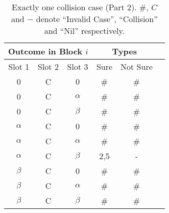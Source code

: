 \documentclass[fleqn]{article}
\begin{document}
\begin {table} 
\centering
\begin{tabular}{|c|c|c|c|c|c|} 
\hline
\multicolumn{3}{|c|}{Outcome in Block $i$} & \multicolumn{2}{c|}{Types} \\ \hline
Slot 1        & Slot 2      & Slot 3       & Sure       & Not Sure      \\ \hline
0             & C           & 0            & \#         & \#            \\ \hline
0             & C           & $\alpha$     & \#         & \#            \\ \hline
0             & C           & $\beta$      & \#         & \#            \\ \hline
$\alpha$      & C           & 0            & \#         & \#            \\ \hline
$\alpha$      & C           & $\alpha$     & \#         & \#            \\ \hline
$\alpha$      & C           & $\beta$      & 2,5        & -             \\ \hline
$\beta$       & C           & 0            & \#         & \#            \\ \hline
$\beta$       & C           & $\alpha$     & \#         & \#            \\ \hline
$\beta$       & C           & $\beta$      & \#         & \#            \\ \hline

\end{tabular}
\caption{Exactly one collision case (Part 2). \#, $C$ and $-$ denote ``Invalid Case'', ``Collision'' and  ``Nil'' respectively.}
\label{Tab_OneC2}
\end{table}
\end{document}

